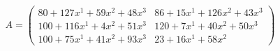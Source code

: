 \documentclass[preview]{standalone}
\begin{document}
\begin{align*}
A = \begin{pmatrix}80 + 127x^{1} + 59x^{2} + 48x^{3} & 86 + 15x^{1} + 126x^{2} + 43x^{3} \\ 100 + 116x^{1} + 4x^{2} + 51x^{3} & 120 + 7x^{1} + 40x^{2} + 50x^{3} \\ 100 + 75x^{1} + 41x^{2} + 93x^{3} & 23 + 16x^{1} + 58x^{2}\end{pmatrix}
\end{align*}
\end{document}
